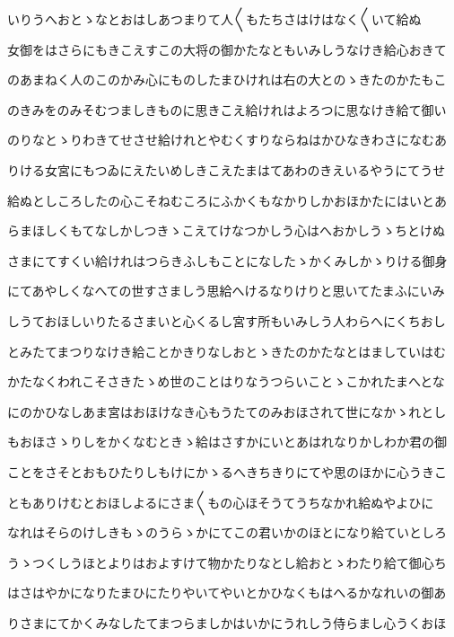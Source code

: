 \documentclass[a4paper,11pt,landscape]{ltjtarticle}
\begin{document}
\par\medskip
いりうへおとゝなとおはしあつまりて人〱もたちさはけはなく〱いて給ぬ
\par\medskip
女御をはさらにもきこえすこの大将の御かたなともいみしうなけき給心おきて
\par\medskip
のあまねく人のこのかみ心にものしたまひけれは右の大とのゝきたのかたもこ
\par\medskip
のきみをのみそむつましきものに思きこえ給けれはよろつに思なけき給て御い
\par\medskip
のりなとゝりわきてせさせ給けれとやむくすりならねはかひなきわさになむあ
\par\medskip
りける女宮にもつゐにえたいめしきこえたまはてあわのきえいるやうにてうせ
\par\medskip
給ぬとしころしたの心こそねむころにふかくもなかりしかおほかたにはいとあ
\par\medskip
らまほしくもてなしかしつきゝこえてけなつかしう心はへおかしうゝちとけぬ
\par\medskip
さまにてすくい給けれはつらきふしもことになしたゝかくみしかゝりける御身
\par\medskip
にてあやしくなへての世すさましう思給へけるなりけりと思いてたまふにいみ
\par\medskip
しうておほしいりたるさまいと心くるし宮す所もいみしう人わらへにくちおし
\par\medskip
とみたてまつりなけき給ことかきりなしおとゝきたのかたなとはましていはむ
\par\medskip
かたなくわれこそさきたゝめ世のことはりなうつらいことゝこかれたまへとな
\par\medskip
にのかひなしあま宮はおほけなき心もうたてのみおほされて世になかゝれとし
\par\medskip
もおほさゝりしをかくなむときゝ給はさすかにいとあはれなりかしわか君の御
\par\medskip
ことをさそとおもひたりしもけにかゝるへきちきりにてや思のほかに心うきこ
\par\medskip
ともありけむとおほしよるにさま〱もの心ほそうてうちなかれ給ぬやよひに
\par\medskip
なれはそらのけしきもゝのうらゝかにてこの君いかのほとになり給ていとしろ
\par\medskip
うゝつくしうほとよりはおよすけて物かたりなとし給おとゝわたり給て御心ち
\par\medskip
はさはやかになりたまひにたりやいてやいとかひなくもはへるかなれいの御あ
\par\medskip
りさまにてかくみなしたてまつらましかはいかにうれしう侍らまし心うくおほ
\par\medskip
\end{document}
